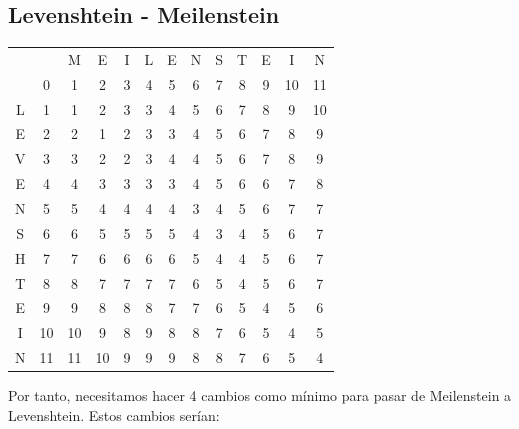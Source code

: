 \documentclass[10pt,a4paper,spanish]{report}
\theoremstyle{definition}
\theoremstyle{remark}
\begin{document}
\subsection{\textcolor{amethyst}Levenshtein - \textcolor{amethyst}Meilenstein}
\begin{center}
\begin{tabular}{c|c|c|c|c|c|c|c|c|c|c|c|c|}
\multicolumn{2}{r}{} & \multicolumn{1}{c}{M} & \multicolumn{1}{c}{E} & \multicolumn{1}{c}{I} & \multicolumn{1}{c}{L} & \multicolumn{1}{c}{E} & \multicolumn{1}{c}{N} & \multicolumn{1}{c}{S} & \multicolumn{1}{c}{T} & \multicolumn{1}{c}{E} & \multicolumn{1}{c}{I} & \multicolumn{1}{c}{N} \\ 
\cline{2-13} 
& 0 & 1 & 2 & 3 & 4 & 5 & 6 & 7 & 8 & 9 & 10 & 11 \\
\cline{2-13}
L & 1 & 1 & 2 & 3 & 3 & 4 & 5 & 6 & 7 & 8 & 9 & 10 \\
\cline{2-13} 
E & 2 & 2 & 1 & 2 & 3 & 3 & 4 & 5 & 6 & 7 & 8 & 9 \\
\cline{2-13} 
V & 3 & 3 & 2 & 2 & 3 & 4 & 4 & 5 & 6 & 7 & 8 & 9 \\
\cline{2-13} 
E & 4 & 4 & 3 & 3 & 3 & 3 & 4 & 5 & 6 & 6 & 7 & 8 \\
\cline{2-13} 
N & 5 & 5 & 4 & 4 & 4 & 4 & 3 & 4 & 5 & 6 & 7 & 7 \\
\cline{2-13} 
S & 6 & 6 & 5 & 5 & 5 & 5 & 4 & 3 & 4 & 5 & 6 & 7 \\
\cline{2-13} 
H & 7 & 7 & 6 & 6 & 6 & 6 & 5 & 4 & 4 & 5 & 6 & 7 \\
\cline{2-13} 
T & 8 & 8 & 7 & 7 & 7 & 7 & 6 & 5 & 4 & 5 & 6 & 7 \\
\cline{2-13}
E & 9 & 9 & 8 & 8 & 8 & 7 & 7 & 6 & 5 & 4 & 5 & 6 \\
\cline{2-13} 
I & 10 & 10 & 9 & 8 & 9 & 8 & 8 & 7 & 6 & 5 & 4 & 5 \\
\cline{2-13} 
N & 11 & 11 & 10 & 9 & 9 & 9 & 8 & 8 & 7 & 6 & 5 & \cellcolor{Green}4 \\
\cline{2-13} 
\end{tabular}
\end{center}

Por tanto, necesitamos hacer 4 cambios como mínimo para pasar de Meilenstein a Levenshtein. Estos cambios serían:
\end{document}
